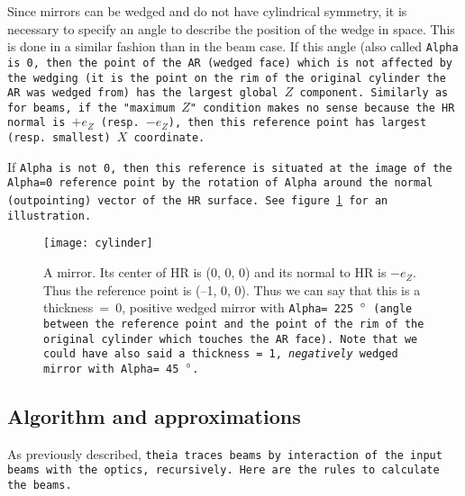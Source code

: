 \documentclass{article}
\begin{document}
Since mirrors can be wedged and do not have cylindrical symmetry, it is necessary to specify an angle to describe the position of the wedge in space. This is done in a similar fashion than in the beam case. If this angle (also called \tt{Alpha} is 0, then the point of the AR (wedged face) which is not affected by the wedging (it is the point on the rim of the original cylinder the AR was wedged from) has the largest global $Z$ component. Similarly as for beams, if the "maximum $Z$" condition makes no sense because the HR normal is  $+ e_Z$ (resp. $-e_Z$), then this reference point has largest (resp. smallest) $X$ coordinate.

If \tt{Alpha} is not 0, then this reference is situated at the image of the \tt{Alpha=0} reference point by the rotation of \tt{Alpha} around the normal (outpointing) vector of the HR surface. See figure \ref{cylinder} for an illustration.


\begin{figure}[h]
\begin{center}
\texttt{[image: cylinder]}
\caption{A mirror. Its center of HR is (0, 0, 0) and its normal to HR is $-e_Z$. Thus the reference point is (--1, 0, 0). Thus we can say that this is a thickness~=~0, positive wedged mirror with \tt{Alpha=}~225~$\degree$ (angle between the reference point and the point of the rim of the original cylinder which touches the AR face). Note that we could have also said a thickness~=~1, \textit{negatively} wedged mirror with \tt{Alpha=}~45~$\degree$.}
\label{cylinder}
\end{center}
\end{figure}


\subsection{Algorithm and approximations}
As previously described, \tt{theia} traces beams by interaction of the input beams with the optics, recursively. Here are the rules to calculate the beams.
\end{document}
